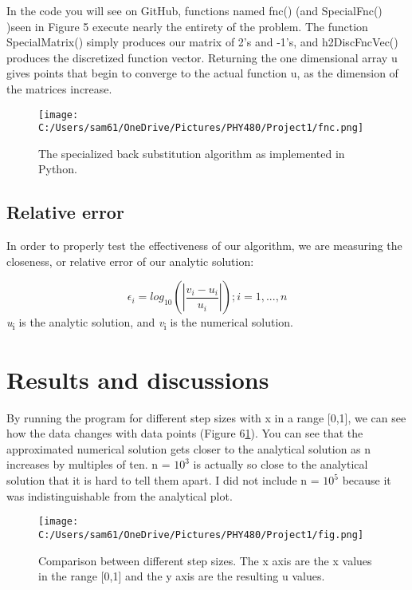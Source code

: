 \documentclass[10pt,showpacs,preprintnumbers,footinbib,amsmath,amssymb,aps,prl,twocolumn,groupedaddress,superscriptaddress,showkeys]{revtex4-1}
\begin{document}
In the code you will see on GitHub, functions named fnc() (and SpecialFnc() )seen in Figure 5 execute nearly the entirety of the problem. The function SpecialMatrix() simply produces our matrix of 2's and -1's, and h2DiscFncVec() produces the discretized function vector. Returning the one dimensional array u gives points that begin to converge to the actual function u, as the dimension of the matrices increase.

\begin{figure}[!ht]
	\centering
	\texttt{[image: C:/Users/sam61/OneDrive/Pictures/PHY480/Project1/fnc.png]}
	\caption{ The specialized back substitution algorithm as implemented in Python.  }
\end{figure}

	\subsection{Relative error}
In order to properly test the effectiveness of our algorithm, we are measuring the closeness, or relative error of our analytic solution:

	\begin{equation}
	\epsilon_{i} = log_{10}(|\frac{v_{i}-u_{i}}{u_{i}}|)  ; i = 1,...,n
	\label{error}
	\end{equation}
{\it u}\textsubscript{i} is the analytic solution, and {\it v}\textsubscript{i} is the numerical solution.

\section{Results and discussions}

  By running the program for different step sizes with x in a range [0,1], we can see how the data changes with data points (Figure 6\ref{uvx}). You can see that the approximated numerical solution gets closer to the analytical solution as n increases by multiples of ten. n = $10^{3}$ is actually so close to the analytical solution that it is hard to tell them apart. I did not include n = $10^{5}$ because it was indistinguishable from the analytical plot. 

\begin{figure}[!ht]
	\centering
	\texttt{[image: C:/Users/sam61/OneDrive/Pictures/PHY480/Project1/fig.png]}
	\label{uvx}
	\caption{Comparison between different step sizes.  The x axis are the x values in the range [0,1] and the y axis are the resulting u values.}
\end{figure}
\end{document}

